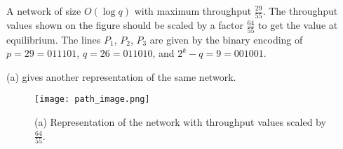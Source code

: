 \documentclass{article}
\begin{document}
A network of size \( O(\log q) \) with maximum throughput \(\frac{29}{55}\). The throughput values shown on the figure should be scaled by a factor \(\frac{64}{55}\) to get the value at equilibrium. The lines \(P_1\), \(P_2\), \(P_3\) are given by the binary encoding of \( p = 29 = 011101 \), \( q = 26 = 011010 \), and \( 2^k - q = 9 = 001001 \).

 (a) gives another representation of the same network.

\begin{figure}[h]
    \centering
    \texttt{[image: path\_image.png]} %
    \caption{(a) Representation of the network with throughput values scaled by \(\frac{64}{55}\).}
    \label{fig:reversed-optimal-capacity-network}
\end{figure}
\end{document}
